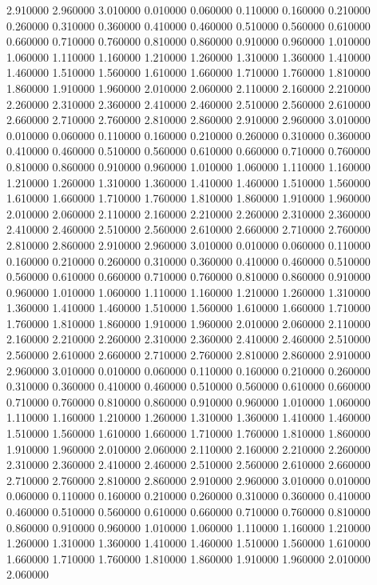 2.910000
2.960000
3.010000
0.010000
0.060000
0.110000
0.160000
0.210000
0.260000
0.310000
0.360000
0.410000
0.460000
0.510000
0.560000
0.610000
0.660000
0.710000
0.760000
0.810000
0.860000
0.910000
0.960000
1.010000
1.060000
1.110000
1.160000
1.210000
1.260000
1.310000
1.360000
1.410000
1.460000
1.510000
1.560000
1.610000
1.660000
1.710000
1.760000
1.810000
1.860000
1.910000
1.960000
2.010000
2.060000
2.110000
2.160000
2.210000
2.260000
2.310000
2.360000
2.410000
2.460000
2.510000
2.560000
2.610000
2.660000
2.710000
2.760000
2.810000
2.860000
2.910000
2.960000
3.010000
0.010000
0.060000
0.110000
0.160000
0.210000
0.260000
0.310000
0.360000
0.410000
0.460000
0.510000
0.560000
0.610000
0.660000
0.710000
0.760000
0.810000
0.860000
0.910000
0.960000
1.010000
1.060000
1.110000
1.160000
1.210000
1.260000
1.310000
1.360000
1.410000
1.460000
1.510000
1.560000
1.610000
1.660000
1.710000
1.760000
1.810000
1.860000
1.910000
1.960000
2.010000
2.060000
2.110000
2.160000
2.210000
2.260000
2.310000
2.360000
2.410000
2.460000
2.510000
2.560000
2.610000
2.660000
2.710000
2.760000
2.810000
2.860000
2.910000
2.960000
3.010000
0.010000
0.060000
0.110000
0.160000
0.210000
0.260000
0.310000
0.360000
0.410000
0.460000
0.510000
0.560000
0.610000
0.660000
0.710000
0.760000
0.810000
0.860000
0.910000
0.960000
1.010000
1.060000
1.110000
1.160000
1.210000
1.260000
1.310000
1.360000
1.410000
1.460000
1.510000
1.560000
1.610000
1.660000
1.710000
1.760000
1.810000
1.860000
1.910000
1.960000
2.010000
2.060000
2.110000
2.160000
2.210000
2.260000
2.310000
2.360000
2.410000
2.460000
2.510000
2.560000
2.610000
2.660000
2.710000
2.760000
2.810000
2.860000
2.910000
2.960000
3.010000
0.010000
0.060000
0.110000
0.160000
0.210000
0.260000
0.310000
0.360000
0.410000
0.460000
0.510000
0.560000
0.610000
0.660000
0.710000
0.760000
0.810000
0.860000
0.910000
0.960000
1.010000
1.060000
1.110000
1.160000
1.210000
1.260000
1.310000
1.360000
1.410000
1.460000
1.510000
1.560000
1.610000
1.660000
1.710000
1.760000
1.810000
1.860000
1.910000
1.960000
2.010000
2.060000
2.110000
2.160000
2.210000
2.260000
2.310000
2.360000
2.410000
2.460000
2.510000
2.560000
2.610000
2.660000
2.710000
2.760000
2.810000
2.860000
2.910000
2.960000
3.010000
0.010000
0.060000
0.110000
0.160000
0.210000
0.260000
0.310000
0.360000
0.410000
0.460000
0.510000
0.560000
0.610000
0.660000
0.710000
0.760000
0.810000
0.860000
0.910000
0.960000
1.010000
1.060000
1.110000
1.160000
1.210000
1.260000
1.310000
1.360000
1.410000
1.460000
1.510000
1.560000
1.610000
1.660000
1.710000
1.760000
1.810000
1.860000
1.910000
1.960000
2.010000
2.060000
